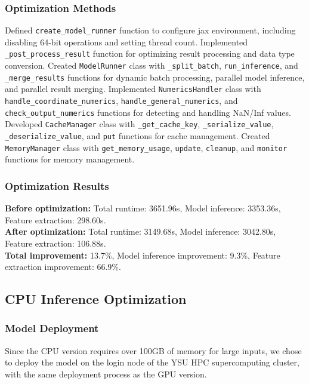 \documentclass[a4paper,12pt]{article}
\begin{document}
\subsubsection{Optimization Methods}
Defined \texttt{create\_model\_runner} function to configure jax environment, including disabling 64-bit operations and setting thread count. Implemented \texttt{\_post\_process\_result} function for optimizing result processing and data type conversion. Created \texttt{ModelRunner} class with \texttt{\_split\_batch}, \texttt{run\_inference}, and \texttt{\_merge\_results} functions for dynamic batch processing, parallel model inference, and parallel result merging. Implemented \texttt{NumericsHandler} class with \texttt{handle\_coordinate\_numerics}, \texttt{handle\_general\_numerics}, and \texttt{check\_output\_numerics} functions for detecting and handling NaN/Inf values. Developed \texttt{CacheManager} class with \texttt{\_get\_cache\_key}, \texttt{\_serialize\_value}, \texttt{\_deserialize\_value}, and \texttt{put} functions for cache management. Created \texttt{MemoryManager} class with \texttt{get\_memory\_usage}, \texttt{update}, \texttt{cleanup}, and \texttt{monitor} functions for memory management.

\subsubsection{Optimization Results}
\textbf{Before optimization:} Total runtime: 3651.96s, Model inference: 3353.36s, Feature extraction: 298.60s. \\
\textbf{After optimization:} Total runtime: 3149.68s, Model inference: 3042.80s, Feature extraction: 106.88s. \\
\textbf{Total improvement:} 13.7\%, Model inference improvement: 9.3\%, Feature extraction improvement: 66.9\%.

\subsection{CPU Inference Optimization}

\subsubsection{Model Deployment}
Since the CPU version requires over 100GB of memory for large inputs, we chose to deploy the model on the login node of the YSU HPC supercomputing cluster, with the same deployment process as the GPU version.
\end{document}

